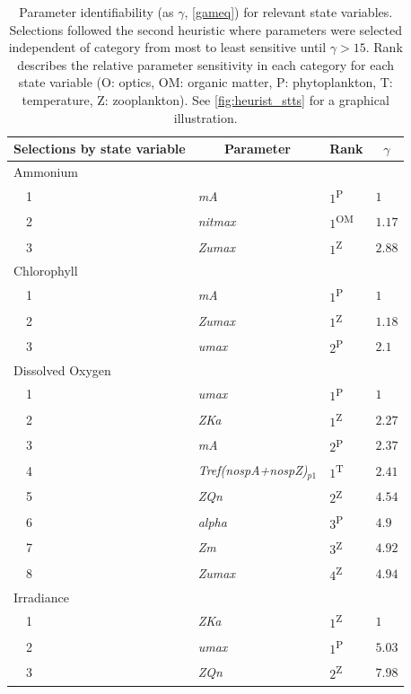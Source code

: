 \documentclass[letterpaper,12pt,oneside]{article}\usepackage[]{graphicx}\usepackage[]{color}
\begin{document}
\begin{table}[!tbp]
{\footnotesize
\caption{Parameter identifiability (as $\gamma$, \cref{gameq}) for relevant state variables.  Selections followed the second heuristic where parameters were selected independent of category from most to least sensitive until $\gamma > 15$.  Rank describes the relative parameter sensitivity in each category for each state variable (O: optics, OM: organic matter, P: phytoplankton, T: temperature, Z: zooplankton). See \cref{fig:heurist_stts} for a graphical illustration.\label{tab:heurist2}} 
\begin{center}
\begin{tabular}{llll}
\hline\hline
\multicolumn{1}{l}{Selections by state variable}&\multicolumn{1}{c}{Parameter}&\multicolumn{1}{c}{Rank}&\multicolumn{1}{c}{$\gamma$}\tabularnewline
\hline
{Ammonium}&&&\tabularnewline
~~1&\footnotesize{\textit{mA}}&$1$\textsuperscript{P}&$1$\tabularnewline
~~2&\footnotesize{\textit{nitmax}}&$1$\textsuperscript{OM}&$1.17$\tabularnewline
~~3&\footnotesize{\textit{Zumax}}&$1$\textsuperscript{Z}&$2.88$\tabularnewline
\hline
{Chlorophyll}&&&\tabularnewline
~~1&\footnotesize{\textit{mA}}&$1$\textsuperscript{P}&$1$\tabularnewline
~~2&\footnotesize{\textit{Zumax}}&$1$\textsuperscript{Z}&$1.18$\tabularnewline
~~3&\footnotesize{\textit{umax}}&$2$\textsuperscript{P}&$2.1$\tabularnewline
\hline
{Dissolved Oxygen}&&&\tabularnewline
~~1&\footnotesize{\textit{umax}}&$1$\textsuperscript{P}&$1$\tabularnewline
~~2&\footnotesize{\textit{ZKa}}&$1$\textsuperscript{Z}&$2.27$\tabularnewline
~~3&\footnotesize{\textit{mA}}&$2$\textsuperscript{P}&$2.37$\tabularnewline
~~4&\footnotesize{\textit{Tref(nospA+nospZ)$_{p1}$}}&$1$\textsuperscript{T}&$2.41$\tabularnewline
~~5&\footnotesize{\textit{ZQn}}&$2$\textsuperscript{Z}&$4.54$\tabularnewline
~~6&\footnotesize{\textit{alpha}}&$3$\textsuperscript{P}&$4.9$\tabularnewline
~~7&\footnotesize{\textit{Zm}}&$3$\textsuperscript{Z}&$4.92$\tabularnewline
~~8&\footnotesize{\textit{Zumax}}&$4$\textsuperscript{Z}&$4.94$\tabularnewline
\hline
{Irradiance}&&&\tabularnewline
~~1&\footnotesize{\textit{ZKa}}&$1$\textsuperscript{Z}&$1$\tabularnewline
~~2&\footnotesize{\textit{umax}}&$1$\textsuperscript{P}&$5.03$\tabularnewline
~~3&\footnotesize{\textit{ZQn}}&$2$\textsuperscript{Z}&$7.98$\tabularnewline

\end{tabular}
\end{center}}
\end{table}
\end{document}
